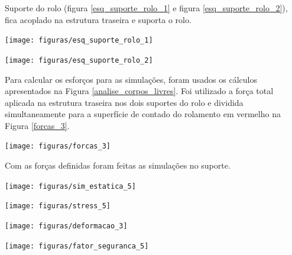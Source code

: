 Suporte do rolo (figura \ref{esq_suporte_rolo_1} e figura \ref{esq_suporte_rolo_2}), fica acoplado na estrutura traseira e suporta o rolo.
 
    \begin{center}
    	\texttt{[image: figuras/esq\_suporte\_rolo\_1]}
        \label{esq_suporte_rolo_1}
    \end{center} 
 
    \begin{center}
    	\texttt{[image: figuras/esq\_suporte\_rolo\_2]}
        \label{esq_suporte_rolo_2}
    \end{center}
 
Para calcular os esforços para as simulações, foram usados os cálculos apresentados na Figura \ref{analise_corpos_livres}.  Foi utilizado a força total aplicada na estrutura traseira nos dois suportes do rolo e dividida simultaneamente para a superfície de contado do rolamento em vermelho na Figura \ref{forcas_3}.

    \begin{center}
    	\texttt{[image: figuras/forcas\_3]}
        \label{forcas_3}
    \end{center}
    
Com as forças definidas foram feitas as simulações no suporte.
    \begin{center}
    	\texttt{[image: figuras/sim\_estatica\_5]}
        \label{sim_estatica_5}
    \end{center} 
    
     \begin{center}
    	\texttt{[image: figuras/stress\_5]}
        \label{stress_5}
    \end{center} 
    
    \begin{center}
    	\texttt{[image: figuras/deformacao\_3]}
        \label{deformacao_3}
    \end{center} 
    
     \begin{center}
    	\texttt{[image: figuras/fator\_seguranca\_5]}
        \label{fator_seguranca_5}
    \end{center} 
    
